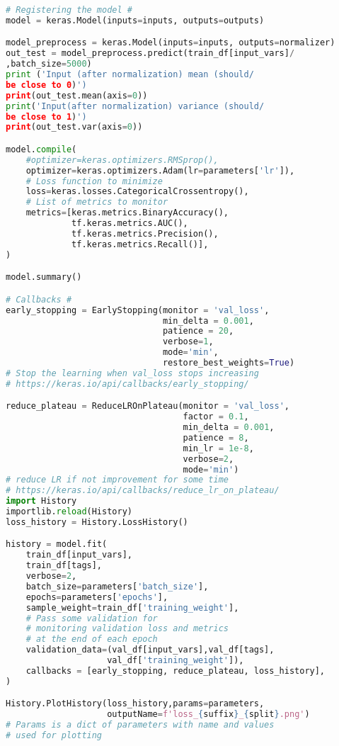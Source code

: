 \begin{lstlisting}[language=Python, caption=DNN setup for the \wwgg semi-leptonic final state, label={dnncode}]
# Registering the model #
model = keras.Model(inputs=inputs, outputs=outputs)

model_preprocess = keras.Model(inputs=inputs, outputs=normalizer)
out_test = model_preprocess.predict(train_df[input_vars]/
,batch_size=5000)
print ('Input (after normalization) mean (should/
be close to 0)')
print(out_test.mean(axis=0))
print('Input(after normalization) variance (should/
be close to 1)')
print(out_test.var(axis=0))

model.compile(
    #optimizer=keras.optimizers.RMSprop(),
    optimizer=keras.optimizers.Adam(lr=parameters['lr']),
    # Loss function to minimize
    loss=keras.losses.CategoricalCrossentropy(),
    # List of metrics to monitor
    metrics=[keras.metrics.BinaryAccuracy(),
             tf.keras.metrics.AUC(),
             tf.keras.metrics.Precision(),
             tf.keras.metrics.Recall()],
)

model.summary()

# Callbacks #
early_stopping = EarlyStopping(monitor = 'val_loss',
                               min_delta = 0.001, 
                               patience = 20,
                               verbose=1,
                               mode='min',
                               restore_best_weights=True)
# Stop the learning when val_loss stops increasing 
# https://keras.io/api/callbacks/early_stopping/

reduce_plateau = ReduceLROnPlateau(monitor = 'val_loss',
                                   factor = 0.1,
                                   min_delta = 0.001, 
                                   patience = 8,
                                   min_lr = 1e-8,
                                   verbose=2,
                                   mode='min')
# reduce LR if not improvement for some time 
# https://keras.io/api/callbacks/reduce_lr_on_plateau/
import History 
importlib.reload(History)
loss_history = History.LossHistory()

history = model.fit(
    train_df[input_vars],
    train_df[tags],
    verbose=2,
    batch_size=parameters['batch_size'],
    epochs=parameters['epochs'],
    sample_weight=train_df['training_weight'],
    # Pass some validation for
    # monitoring validation loss and metrics
    # at the end of each epoch
    validation_data=(val_df[input_vars],val_df[tags],
                    val_df['training_weight']),
    callbacks = [early_stopping, reduce_plateau, loss_history],
)

History.PlotHistory(loss_history,params=parameters,
                    outputName=f'loss_{suffix}_{split}.png')
# Params is a dict of parameters with name and values
# used for plotting


\end{lstlisting}
